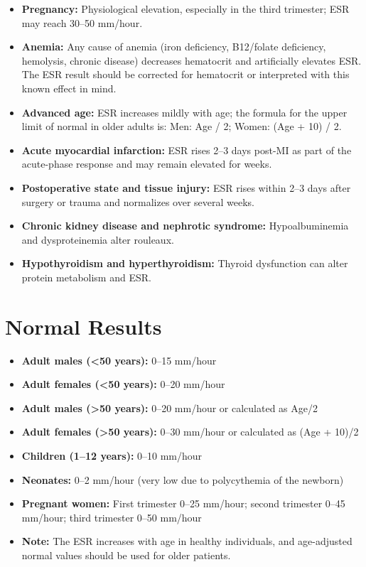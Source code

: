 \begin{itemize}
  \item \textbf{Pregnancy:} Physiological elevation, especially in the third trimester; ESR may reach 30--50 mm/hour.
  \item \textbf{Anemia:} Any cause of anemia (iron deficiency, B12/folate deficiency, hemolysis, chronic disease) decreases hematocrit and artificially elevates ESR. The ESR result should be corrected for hematocrit or interpreted with this known effect in mind.
  \item \textbf{Advanced age:} ESR increases mildly with age; the formula for the upper limit of normal in older adults is: Men: Age / 2; Women: (Age + 10) / 2.
  \item \textbf{Acute myocardial infarction:} ESR rises 2--3 days post-MI as part of the acute-phase response and may remain elevated for weeks.
  \item \textbf{Postoperative state and tissue injury:} ESR rises within 2--3 days after surgery or trauma and normalizes over several weeks.
  \item \textbf{Chronic kidney disease and nephrotic syndrome:} Hypoalbuminemia and dysproteinemia alter rouleaux.
  \item \textbf{Hypothyroidism and hyperthyroidism:} Thyroid dysfunction can alter protein metabolism and ESR.
\end{itemize}

\section*{Normal Results}
\begin{itemize}
  \item \textbf{Adult males (<50 years):} 0--15 mm/hour
  \item \textbf{Adult females (<50 years):} 0--20 mm/hour
  \item \textbf{Adult males (>50 years):} 0--20 mm/hour or calculated as Age/2
  \item \textbf{Adult females (>50 years):} 0--30 mm/hour or calculated as (Age + 10)/2
  \item \textbf{Children (1--12 years):} 0--10 mm/hour
  \item \textbf{Neonates:} 0--2 mm/hour (very low due to polycythemia of the newborn)
  \item \textbf{Pregnant women:} First trimester 0--25 mm/hour; second trimester 0--45 mm/hour; third trimester 0--50 mm/hour
  \item \textbf{Note:} The ESR increases with age in healthy individuals, and age-adjusted normal values should be used for older patients.
\end{itemize}

